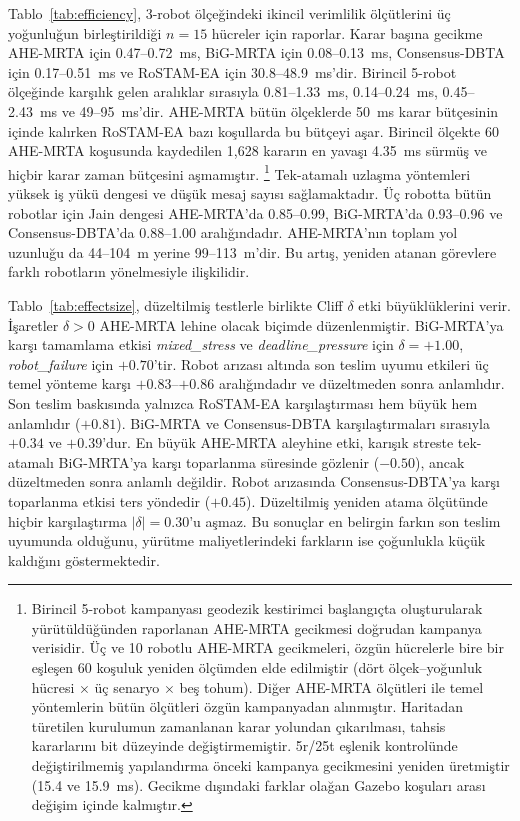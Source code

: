 \documentclass[10pt,letterpaper,onecolumn]{IEEEtran}
\begin{document}
Tablo~\ref{tab:efficiency}, 3-robot ölçeğindeki ikincil verimlilik ölçütlerini
üç yoğunluğun birleştirildiği $n{=}15$ hücreler için raporlar. Karar başına
gecikme AHE-MRTA için 0.47--0.72~ms, BiG-MRTA için 0.08--0.13~ms,
Consensus-DBTA için 0.17--0.51~ms ve RoSTAM-EA için 30.8--48.9~ms'dir.
Birincil 5-robot ölçeğinde karşılık gelen aralıklar sırasıyla 0.81--1.33~ms,
0.14--0.24~ms, 0.45--2.43~ms ve 49--95~ms'dir. AHE-MRTA bütün ölçeklerde
50~ms karar bütçesinin içinde kalırken RoSTAM-EA bazı koşullarda bu bütçeyi
aşar. Birincil ölçekte 60 AHE-MRTA koşusunda kaydedilen 1{,}628 kararın en
yavaşı 4.35~ms sürmüş ve hiçbir karar zaman bütçesini aşmamıştır.
\footnote{Birincil 5-robot kampanyası geodezik kestirimci başlangıçta
oluşturularak yürütüldüğünden raporlanan AHE-MRTA gecikmesi doğrudan kampanya
verisidir. Üç ve 10 robotlu AHE-MRTA gecikmeleri, özgün hücrelerle bire bir
eşleşen 60 koşuluk yeniden ölçümden elde edilmiştir (dört ölçek--yoğunluk
hücresi $\times$ üç senaryo $\times$ beş tohum). Diğer AHE-MRTA ölçütleri ile
temel yöntemlerin bütün ölçütleri özgün kampanyadan alınmıştır. Haritadan
türetilen kurulumun zamanlanan karar yolundan çıkarılması, tahsis kararlarını
bit düzeyinde değiştirmemiştir. 5r/25t eşlenik kontrolünde değiştirilmemiş
yapılandırma önceki kampanya gecikmesini yeniden üretmiştir (15.4 ve 15.9~ms).
Gecikme dışındaki farklar olağan Gazebo koşuları arası değişim içinde
kalmıştır.}
Tek-atamalı uzlaşma yöntemleri yüksek iş yükü dengesi ve düşük mesaj sayısı
sağlamaktadır. Üç robotta bütün robotlar için Jain dengesi AHE-MRTA'da
0.85--0.99, BiG-MRTA'da 0.93--0.96 ve Consensus-DBTA'da 0.88--1.00
aralığındadır. AHE-MRTA'nın toplam yol uzunluğu da 44--104~m yerine
99--113~m'dir. Bu artış, yeniden atanan görevlere farklı robotların yönelmesiyle
ilişkilidir.



Tablo~\ref{tab:effectsize}, düzeltilmiş testlerle birlikte Cliff $\delta$
etki büyüklüklerini verir. İşaretler $\delta{>}0$ AHE-MRTA lehine olacak
biçimde düzenlenmiştir. BiG-MRTA'ya karşı tamamlama etkisi
\textit{mixed\_stress} ve \textit{deadline\_pressure} için
$\delta{=}{+}1.00$, \textit{robot\_failure} için ${+}0.70$'tir. Robot arızası
altında son teslim uyumu etkileri üç temel yönteme karşı ${+}0.83$--${+}0.86$
aralığındadır ve düzeltmeden sonra anlamlıdır. Son teslim baskısında yalnızca
RoSTAM-EA karşılaştırması hem büyük hem anlamlıdır (${+}0.81$). BiG-MRTA ve
Consensus-DBTA karşılaştırmaları sırasıyla ${+}0.34$ ve ${+}0.39$'dur.
En büyük AHE-MRTA aleyhine etki, karışık streste tek-atamalı BiG-MRTA'ya karşı
toparlanma süresinde gözlenir (${-}0.50$), ancak düzeltmeden sonra anlamlı
değildir. Robot arızasında Consensus-DBTA'ya karşı toparlanma etkisi ters
yöndedir (${+}0.45$). Düzeltilmiş yeniden atama ölçütünde hiçbir karşılaştırma
$|\delta|{=}0.30$'u aşmaz. Bu sonuçlar en belirgin farkın son teslim uyumunda
olduğunu, yürütme maliyetlerindeki farkların ise çoğunlukla küçük kaldığını
göstermektedir.
\end{document}
